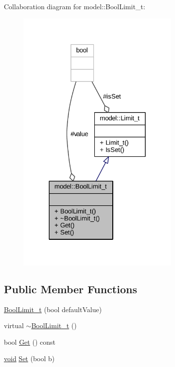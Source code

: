 Collaboration diagram for model\+:\+:Bool\+Limit\+\_\+t\+:
\nopagebreak
\begin{figure}[H]
\begin{center}
\leavevmode
\includegraphics[width=228pt]{classmodel_1_1_bool_limit__t__coll__graph}
\end{center}
\end{figure}
\subsection*{Public Member Functions}
\begin{DoxyCompactItemize}
\item 
\hyperlink{classmodel_1_1_bool_limit__t_a5222ec463d7e9938f581f3798221f498}{Bool\+Limit\+\_\+t} (bool default\+Value)
\item 
virtual \hyperlink{classmodel_1_1_bool_limit__t_a9abda6ff132b53b824b1a1df0958c3e0}{$\sim$\+Bool\+Limit\+\_\+t} ()
\item 
bool \hyperlink{classmodel_1_1_bool_limit__t_a54b31be4201ae4700ed1251f181c4263}{Get} () const 
\item 
\hyperlink{_t_e_m_p_l_a_t_e__cdef_8h_ac9c84fa68bbad002983e35ce3663c686}{void} \hyperlink{classmodel_1_1_bool_limit__t_a2842a6ad101d41ed1c9a5e1ae7293d55}{Set} (bool b)
\end{DoxyCompactItemize}
